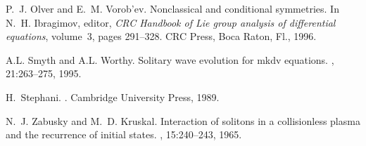 \documentclass[
11pt,%
tightenlines,%
twoside,%
onecolumn,%
nofloats,%
nobibnotes,%
nofootinbib,%
superscriptaddress,%
noshowpacs,%
centertags]%
{revtex4}
\begin{document}
\begin{thebibliography}{20}
P.~J. Olver and E.~M. Vorob'ev.
\newblock Nonclassical and conditional symmetries.
\newblock In N.~H. Ibragimov, editor, {\em CRC Handbook of Lie group analysis
  of differential equations}, volume~3, pages 291--328. CRC Press, Boca Raton,
  Fl., 1996.

A.L. Smyth and A.L. Worthy.
\newblock Solitary wave evolution for mkdv equations.
, 21:263--275, 1995.

H.~Stephani.
.
\newblock Cambridge University Press, 1989.

N.~J. Zabusky and M.~D. Kruskal.
\newblock Interaction of solitons in a collisionless plasma and the recurrence
  of initial states.
, 15:240--243, 1965.

\end{thebibliography}
\end{document}
